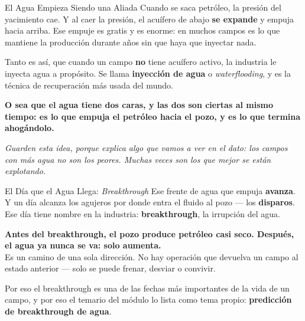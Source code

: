 \documentclass[aspectratio=169, 11pt]{beamer}
\begin{document}
\begin{frame}[shrink=8]{El Agua Empieza Siendo una Aliada}
  \vspace{4pt}
  {\footnotesize\color{textMuted}
   Cuando se saca petróleo, la presión del yacimiento cae. Y al caer la
   presión, el acuífero de abajo \textbf{se expande} y empuja hacia arriba.
   Ese empuje es gratis y es enorme: en muchos campos es lo que mantiene la
   producción durante años sin que haya que inyectar nada.}
  \vspace{8pt}
  \begin{tcolorbox}[colback=arcaGray, colframe=codeGreen, boxrule=0pt,
    leftrule=3pt, arc=3pt, left=9pt, right=9pt, top=6pt, bottom=6pt]
    {\footnotesize\color{textMuted}
     Tanto es así, que cuando un campo \textbf{no} tiene acuífero activo, la
     industria le inyecta agua a propósito. Se llama \textbf{inyección de
     agua} o \emph{waterflooding}, y es la técnica de recuperación más usada
     del mundo.}
  \end{tcolorbox}
  \vspace{8pt}
  {\footnotesize\color{arcaDark}\bfseries
   O sea que el agua tiene dos caras, y las dos son ciertas al mismo tiempo:
   es lo que empuja el petróleo hacia el pozo, y es lo que termina ahogándolo.}
  \vspace{6pt}

  {\scriptsize\color{textMuted}\itshape
   Guarden esta idea, porque explica algo que vamos a ver en el dato: los
   campos con más agua no son los peores. Muchas veces son los que mejor se
   están explotando.}
\end{frame}

\begin{frame}[shrink=8]{El Día que el Agua Llega: \emph{Breakthrough}}
  \vspace{4pt}
  {\footnotesize\color{textMuted}
   Ese frente de agua que empuja \textbf{avanza}. Y un día alcanza los agujeros
   por donde entra el fluido al pozo --- los \textbf{disparos}. Ese día tiene
   nombre en la industria: \textbf{breakthrough}, la irrupción del agua.}
  \vspace{8pt}
  \begin{tcolorbox}[colback=arcaGray, colframe=arcaRed, boxrule=0pt,
    leftrule=4pt, arc=3pt, left=10pt, right=10pt, top=7pt, bottom=7pt]
    {\footnotesize\color{arcaDark}\bfseries
     Antes del breakthrough, el pozo produce petróleo casi seco. Después,
     el agua ya nunca se va: solo aumenta.}\\[5pt]
    {\scriptsize\color{textMuted}
     Es un camino de una sola dirección. No hay operación que devuelva un
     campo al estado anterior --- solo se puede frenar, desviar o convivir.}
  \end{tcolorbox}
  \vspace{8pt}
  {\footnotesize\color{textMuted}
   Por eso el breakthrough es una de las fechas más importantes de la vida de
   un campo, y por eso el temario del módulo lo lista como tema propio:
   \textbf{predicción de breakthrough de agua}.}
\end{frame}
\end{document}
